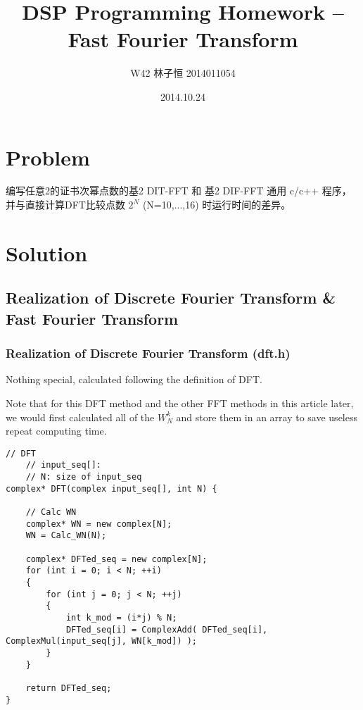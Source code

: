 \documentclass[UTF8,a4paper]{ctexart}
\author{W42 林子恒 2014011054}
\title{DSP Programming Homework -- Fast Fourier Transform}
\date{2014.10.24}
\begin{document}
  \maketitle
  \thispagestyle{empty}

\tableofcontents

\newpage


\section{Problem}

编写任意2的证书次幂点数的基2 DIT-FFT 和 基2 DIF-FFT 通用 c/c++ 程序，并与直接计算DFT比较点数 $2^{N}$ (N=10,...,16) 时运行时间的差异。


\section{Solution}

\subsection{Realization of Discrete Fourier Transform \& Fast Fourier Transform}

\subsubsection{Realization of Discrete Fourier Transform (dft.h)}

Nothing special, calculated following the definition of DFT.

Note that for this DFT method and the other FFT methods in this article later, we would first calculated all of the $W^{k}_{N}$ and store them in an array to save useless repeat computing time.

    \begin{lstlisting}
// DFT
	// input_seq[]: 
	// N: size of input_seq
complex* DFT(complex input_seq[], int N) {

	// Calc WN
	complex* WN = new complex[N];
	WN = Calc_WN(N);

	complex* DFTed_seq = new complex[N];
	for (int i = 0; i < N; ++i)
	{
		for (int j = 0; j < N; ++j)
		{
			int k_mod = (i*j) % N;
			DFTed_seq[i] = ComplexAdd( DFTed_seq[i], ComplexMul(input_seq[j], WN[k_mod]) );
		}
	}

	return DFTed_seq;
}
    \end{lstlisting}
\end{document}
